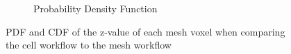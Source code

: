 \begin{figure}[H]
\begin{subfigure}[h]{1.0\textwidth}
		\caption{Probability Density Function}
		\label{fig:2VPII_cdf}
	\end{subfigure}
	\caption{PDF and CDF of the z-value of each mesh voxel when comparing the cell workflow to the mesh workflow}
	\label{fig:2zscores}
\end{figure}
\newpage
